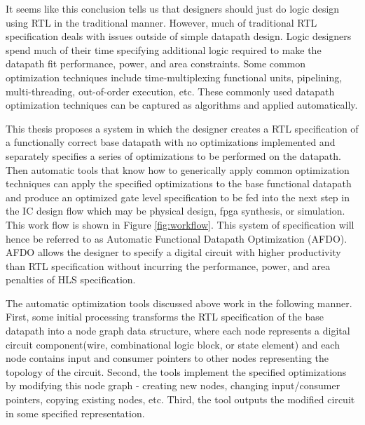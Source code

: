 It seems like this conclusion tells us that designers should just do logic design using RTL in the traditional manner. However, much of traditional RTL specification deals with issues outside of simple datapath design. Logic designers spend much of their time specifying additional logic required to make the datapath fit performance, power, and area constraints. Some common optimization techniques include time-multiplexing functional units, pipelining, multi-threading, out-of-order execution, etc. These commonly used datapath optimization techniques can be captured as algorithms and applied automatically.

This thesis proposes a system in which the designer creates a RTL specification of a functionally correct base datapath with no optimizations implemented and separately specifies a series of optimizations to be performed on the datapath. Then automatic tools that know how to generically apply common optimization techniques can apply the specified optimizations to the base functional datapath and produce an optimized gate level specification to be fed into the next step in the IC design flow which may be physical design, fpga synthesis, or simulation. This work flow is shown in Figure \ref{fig:workflow}. This system of specification will hence be referred to as Automatic Functional Datapath Optimization (AFDO). AFDO allows the designer to specify a digital circuit with higher productivity than RTL specification without incurring the performance, power, and area penalties of HLS specification.

The automatic optimization tools discussed above work in the following manner. First, some initial processing transforms the RTL specification of the base datapath into a node graph data structure, where each node represents a digital circuit component(wire, combinational logic block, or state element) and each node contains input and consumer pointers to other nodes representing the topology of the circuit. Second, the tools implement the specified optimizations by modifying this node graph - creating new nodes, changing input/consumer pointers, copying existing nodes, etc. Third, the tool outputs the modified circuit in some specified representation.

